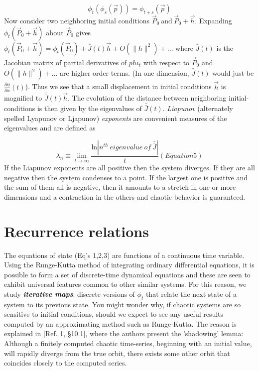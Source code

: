 \documentclass{../lab}
\begin{document}
\begin{equation}
    \phi_t(\phi_s(\vec p))=\phi_{t+s}(\vec p)
\end{equation}
Now consider two neighboring initial conditions $ \vec P_0~\mbox{and}~\vec P_0+\vec h $. Expanding $ \phi_t(\vec P_0+\vec h) $ about $ \vec P_0 $ gives $ \phi_t(\vec P_0+\vec h)= \phi_t(\vec P_0)+\bar{\bar J}(t)\vec h+O(\| h\|^2)+\ldots $ where $ \bar{\bar J}(t) $ is the Jacobian matrix of partial derivatives of $ phi_t $ with respect to $ \vec P_0 $ and $ O(\| h\|^2)+\ldots $ are higher order terms. (In one dimension, $ \bar{\bar J}(t) $ would just be $ \frac{\partial\phi}{\partial x}(t) $). Thus we see that a small displacement in initial conditions $ \vec h $ is magnified to $ \bar{\bar J}(t)\vec h $. The evolution of the distance between neighboring initial-conditions is then given by the eigenvalues of $ \bar{\bar J}(t) $. \emph{Liapunov }(alternately spelled Lyapunov or Ljapunov)\emph{ exponents} are convenient measures of the eigenvalues and are defined as

\begin{equation}
    \lambda_n\equiv \lim_{t \to \infty}\frac{\mbox{ln}| n^{th}~eigenvalue~of~\bar {\bar J}| }{t}  (Equation 5)
\end{equation}
If the Liapunov exponents are all positive then the system diverges. If they are all negative then the system condenses to a point. If the largest one is positive and the sum of them all is negative, then it amounts to a stretch in one or more dimensions and a contraction in the others and chaotic behavior is guaranteed.

\section{Recurrence relations}

The equations of state (Eq's 1,2,3) are functions of a continuous time variable. Using the Runge-Kutta method of integrating ordinary differential equations, it is possible to form a set of discrete-time dynamical equations and these are seen to exhibit universal features common to other similar systems. For this reason, we study \emph{\textbf{iterative maps}}: discrete versions of $ \phi_t $ that relate the next state of a system to its previous state. You might wonder why, if chaotic systems are so sensitive to initial conditions, should we expect to see any useful results computed by an approximating method such as Runge-Kutta. The reason is explained in [Ref. 1, §10.1], where the authors present the 'shadowing' lemma: Although a finitely computed chaotic time-series, beginning with an initial value, will rapidly diverge from the true orbit, there exists some other orbit that coincides closely to the computed series.
\end{document}
